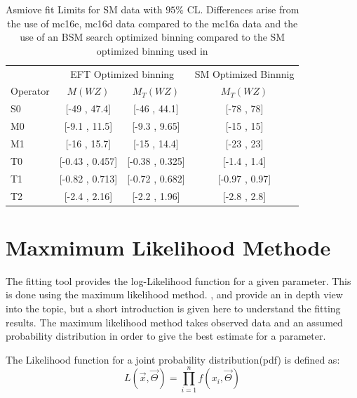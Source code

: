\documentclass[../Bachelorarbeit.tex]{subfiles}
\begin{document}
\begin{table}
    \centering
    \begin{tabular}{l | c c | c }
        \hline
                 & \multicolumn{2}{c|}{EFT Optimized binning} & SM Optimized Binnnig                  \\
        Operator & $M(WZ)$                                    & $M_{T}(WZ)$          & $M_{T}(WZ)$    \\
        \hline
        S0       & [-49 , 47.4]                               & [-46 , 44.1]         & [-78 , 78]     \\
        M0       & [-9.1 , 11.5]                              & [-9.3 , 9.65]        & [-15 , 15]     \\
        M1       & [-16 , 15.7]                               & [-15 , 14.4]         & [-23 , 23]     \\
        T0       & [-0.43 , 0.457]                            & [-0.38 , 0.325]      & [-1.4 , 1.4]   \\
        T1       & [-0.82 , 0.713]                            & [-0.72 , 0.682]      & [-0.97 , 0.97] \\
        T2       & [-2.4 , 2.16]                              & [-2.2 , 1.96]        & [-2.8 , 2.8]   \\
        \hline
    \end{tabular}
    \caption{Asmiove fit Limits for SM data with $95\%$ CL. Differences arise from the use of mc16e, mc16d data compared to the mc16a data and the use of an BSM search optimized binning compared to the SM optimized binning used in \cite{Sampsonidou.25.11.2021}}
    \label{tab:asimov}
\end{table}

\section{Maxmimum Likelihood Methode}
The fitting tool provides the log-Likelihood function for a given parameter. This is done using the maximum likelihood method. \cite{Prof.Dr.KlausReygersDr.RainerStamen.2020}, \cite{Prof.MarkusSchumacherDr.StanLai.2012} and \cite{K.F.RILEY.} provide an in depth view into the topic, but a short introduction is given here to understand the fitting results.
The maximum likelihood method takes observed data and an assumed probability distribution in order to give the best estimate for a parameter.

The Likelihood function for a joint probability distribution(pdf) is defined as:
\begin{equation}
    L(\overrightarrow{x},\overrightarrow{\Theta}) = \prod_{i=1}^{n} f(x_{i},\overrightarrow{\Theta})
\end{equation}
\end{document}
